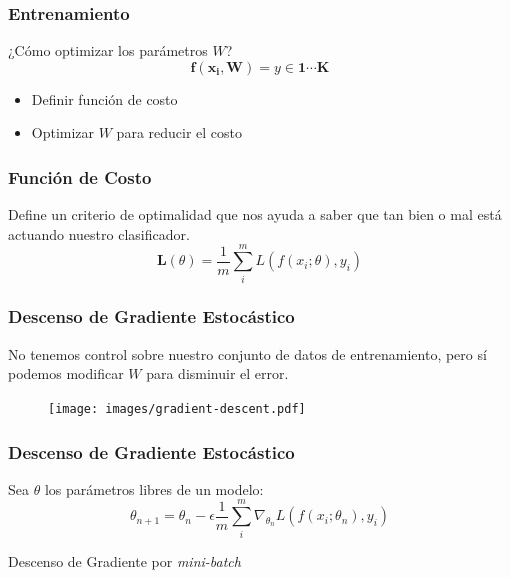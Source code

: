 \documentclass{beamer}
\begin{document}
\begin{frame}
\frametitle{Entrenamiento}
¿Cómo optimizar los parámetros \(W\)?
\vfill
\begin{equation}
    \boldsymbol{f(x_i, W)} = y \in \boldsymbol{1 \cdots K}
\end{equation}\pause
\vfill
\begin{itemize}
    \item Definir función de costo
    \item Optimizar \(W\) para reducir el costo
\end{itemize}
\vfill
\end{frame}




\begin{frame}
\frametitle{Función de Costo}
Define un criterio de optimalidad que nos ayuda a
saber que tan bien o mal está actuando nuestro clasificador.
\vfill
\begin{equation}
\boldsymbol{L}(\theta) = \frac{1}{m} \sum^{m}_{i} L(f(x_i;\theta), y_i)
\end{equation}
\vfill
\end{frame}



\begin{frame}
\frametitle{Descenso de Gradiente Estocástico}
No tenemos control sobre nuestro conjunto de datos de entrenamiento, pero sí podemos modificar \(W\) para disminuir el error.
\vfill
\begin{figure}
    \centering
    \texttt{[image: images/gradient-descent.pdf]}
\end{figure}
\vfill
\end{frame}





\begin{frame}
\frametitle{Descenso de Gradiente Estocástico}
Sea \(\theta\) los parámetros libres de un modelo:
\vfill
\begin{equation}
    \theta_{n+1} = \theta_n - \epsilon \frac{1}{m} \sum^{m}_{i} \nabla_{\theta_{n}} L(f(x_i; \theta_n), y_i)
\end{equation}
\vfill

Descenso de Gradiente por \textit{mini-batch}
\vfill
\end{frame}
\end{document}
